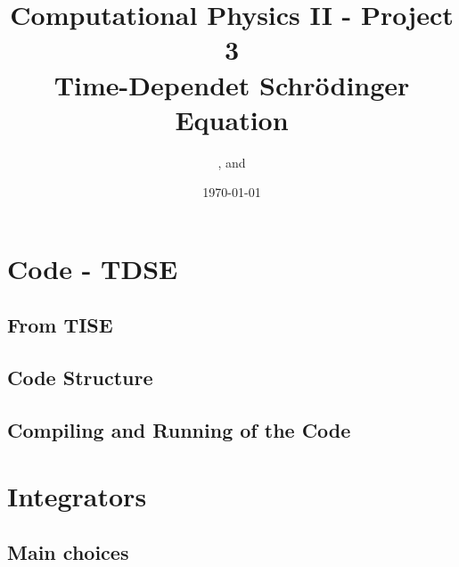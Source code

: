 \documentclass{article}
\title{Computational Physics II - Project 3 \\ Time-Dependet Schrödinger Equation}
\author{\aone\space, \atwo\space and \athree \\ \afour}
\date{\today}
\begin{document}
\maketitle
\tableofcontents
\begin{abstract}
 
\end{abstract}

\section{Code - TDSE}\label{code}

\subsection{From TISE}\label{TISE}

\subsection{Code Structure}\label{strct}

%
\subsection{Compiling and Running of the Code}\label{cmplng}


\section{Integrators}\label{integrator}

\subsection{Main choices}\label{mainchoices}
\end{document}
